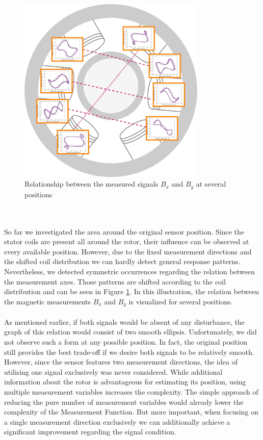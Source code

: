 \documentclass[english]{isasthesis}
\begin{document}
    	\begin{figure}[t!]
    		\centering
    			\includegraphics[width=0.8\textwidth]{figures/Positions/symmetric_pattern.jpg}   	
    		\caption{Relationship between the measured signals $B_x$ and $B_y$ at several positions}
    		\label{fig:pattern}
    		\end{figure}
    	\\\\So far we investigated the area around the original sensor position. Since the stator coils are present all around the rotor, their influence can be observed at every available position. However, due to the fixed measurement directions and the shifted coil distribution we can hardly detect general response patterns. Nevertheless, we detected symmetric occurrences regarding the relation between the measurement axes. Those patterns are shifted according to the coil distribution and can be seen in Figure \ref{fig:pattern}. In this illustration, the relation between the magnetic measurements $B_x$ and $B_y$ is visualized for several positions.\\\\
    	 As mentioned earlier, if both signals would be absent of any disturbance, the graph of this relation would consist of two smooth ellipsis. Unfortunately, we did not observe such a form at any possible position. In fact, the original position still provides the best trade-off if we desire both signals to be relatively smooth. However, since the sensor features two measurement directions, the idea of utilising one signal exclusively was never considered. While additional information about the rotor is advantageous for estimating its position, using multiple measurement variables increases the complexity. The simple approach of reducing the pure number of measurement variables would already lower the complexity of the Measurement Function. But more important, when focusing on a single measurement direction exclusively we can additionally achieve a significant improvement regarding the signal condition. 
\end{document}
